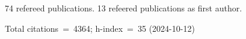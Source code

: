 74 refereed publications. 13 refeered publications as first author.

Total citations~=~4364; h-index~=~35 (2024-10-12)